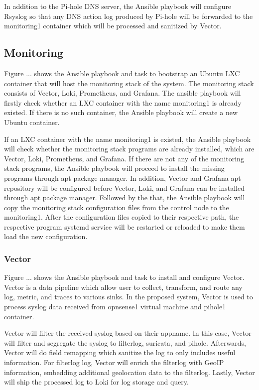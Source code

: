 \documentclass[../index.tex]{subfiles}
\begin{document}
In addition to the Pi-hole DNS server, the Ansible playbook will configure Rsyslog so that any DNS
action log produced by Pi-hole will be forwarded to the monitoring1 container which will be
processed and sanitized by Vector.

\subsection{Monitoring}

Figure ... shows the Ansible playbook and task to bootstrap an Ubuntu LXC container that will host
the monitoring stack of the system. The monitoring stack consists of Vector, Loki, Prometheus, and
Grafana. The ansible playbook will firstly check whether an LXC container with the name monitoring1
is already existed. If there is no such container, the Ansible playbook will create a new Ubuntu
container.

If an LXC container with the name monitoring1 is existed, the Ansible playbook will check whether
the monitoring stack programs are already installed, which are Vector, Loki, Prometheus, and
Grafana. If there are not any of the monitoring stack programs, the Ansible playbook will proceed to
install the missing programs through apt package manager. In addition, Vector and Grafana apt
repository will be configured before Vector, Loki, and Grafana can be installed through apt package
manager. Followed by the that, the Ansible playbook will copy the monitoring stack configuration
files from the control node to the monitoring1. After the configuration files copied to their
respective path, the respective program systemd service will be restarted or reloaded to make them
load the new configuration.

\subsubsection{Vector}

Figure ... shows the Ansible playbook and task to install and configure Vector. Vector is a data
pipeline which allow user to collect, transform, and route any log, metric, and traces to various
sinks. In the proposed system, Vector is used to process syslog data received from opnsense1 virtual
machine and pihole1 container.

Vector will filter the received syslog based on their appname. In this case, Vector will filter and
segregate the syslog to filterlog, suricata, and pihole. Afterwards, Vector will do field remapping
which sanitize the log to only includes useful information. For filterlog log, Vector will enrich
the filterlog with GeoIP information, embedding additional geolocation data to the filterlog.
Lastly, Vector will ship the processed log to Loki for log storage and query.
\end{document}
